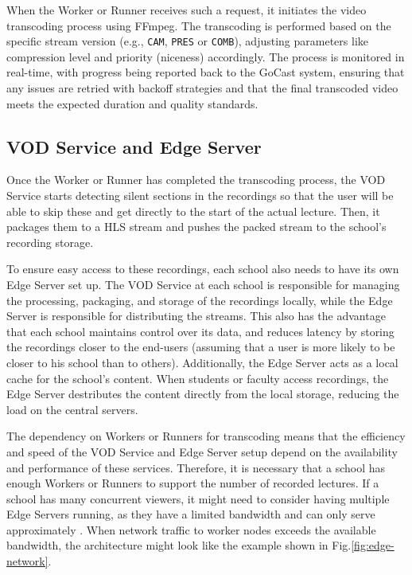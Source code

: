When the Worker or Runner receives such a request, it initiates the video transcoding process using FFmpeg. The transcoding is performed based on the specific stream version (e.g., \texttt{CAM}, \texttt{PRES} or \texttt{COMB}), adjusting parameters like compression level and priority (niceness) accordingly. The process is monitored in real-time, with progress being reported back to the GoCast system, ensuring that any issues are retried with backoff strategies and that the final transcoded video meets the expected duration and quality standards.

\subsection{VOD Service and Edge Server}

Once the Worker or Runner has completed the transcoding process, the VOD Service starts detecting silent sections in the recordings so that the user will be able to skip these and get directly to the start of the actual lecture. Then, it packages them to a \ac{HLS} stream and pushes the packed stream to the school's recording storage.

To ensure easy access to these recordings, each school also needs to have its own Edge Server set up. The VOD Service at each school is responsible for managing the processing, packaging, and storage of the recordings locally, while the Edge Server is responsible for distributing the streams. This also has the advantage that each school maintains control over its data, and reduces latency by storing the recordings closer to the end-users (assuming that a user is more likely to be closer to his school than to others).
Additionally, the Edge Server acts as a local cache for the school's content. When students or faculty access recordings, the Edge Server destributes the content directly from the local storage, reducing the load on the central servers.

The dependency on Workers or Runners for transcoding means that the efficiency and speed of the VOD Service and Edge Server setup depend on the availability and performance of these services. Therefore, it is necessary that a school has enough Workers or Runners to support the number of recorded lectures.
If a school has many concurrent viewers, it might need to consider having multiple Edge Servers running, as they have a limited bandwidth and can only serve approximately . When network traffic to worker nodes exceeds the available bandwidth, the architecture might look like the example shown in Fig.\ref{fig:edge-network}.

